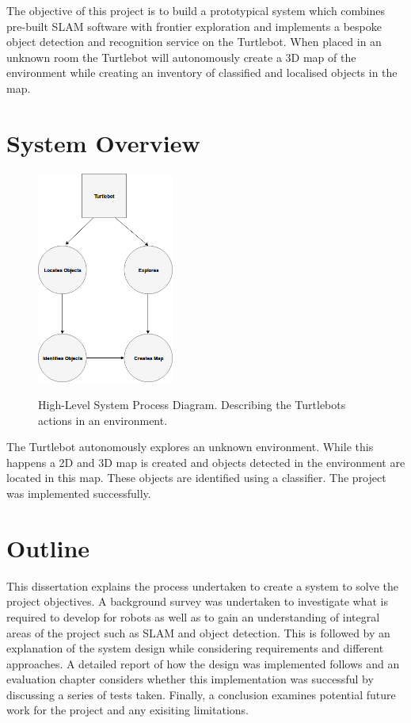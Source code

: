 \documentclass{mproj}
\begin{document}
The objective of this project is to build a prototypical system which combines pre-built SLAM software with frontier exploration and implements a bespoke object detection and recognition service on the Turtlebot. When placed in an unknown room the Turtlebot will autonomously create a 3D map of the environment while creating an inventory of classified and localised objects in the map.

\section{System Overview} 

\begin{figure}[h]
  \caption{High-Level System Process Diagram. Describing the Turtlebots actions in an environment.}
  \centering
  \includegraphics[width=0.4\textwidth]{images/sys1.png}
  \label{fig:System Diagram}
\end{figure} 

The Turtlebot autonomously explores an unknown environment. While this happens  a 2D and 3D map is created and objects detected in the environment are located in this map. These objects are identified using a classifier. 
The project was implemented successfully.

\section{Outline} 

This dissertation explains the process undertaken to create a system to solve the project objectives. A background survey was undertaken to investigate what is required to develop for robots as well as to gain an understanding of integral areas of the project such as SLAM and object detection. This is followed by an explanation of the system design while considering requirements and different approaches. A detailed report of how the design was implemented follows and an evaluation chapter considers whether this implementation was successful by discussing a series of tests taken. Finally, a conclusion examines potential future work for the project and any exisiting limitations.
\end{document}
